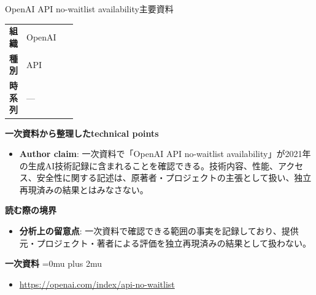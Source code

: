 \begin{technicalnote}{OpenAI API no-waitlist availability}{主要資料}
\begingroup
\begin{tabularx}{\linewidth}{@{}>{\bfseries}p{0.22\linewidth}X@{}}
組織 & OpenAI \\
種別 & API \\
時系列 & — \\
\end{tabularx}
\smallskip
{\bfseries 一次資料から整理したtechnical points}
\begin{itemize}[leftmargin=1.5em,itemsep=0.35em]
\item \textbf{Author claim}: 一次資料で「OpenAI API no-waitlist availability」が2021年の生成AI技術記録に含まれることを確認できる。技術内容、性能、アクセス、安全性に関する記述は、原著者・プロジェクトの主張として扱い、独立再現済みの結果とはみなさない。
\end{itemize}
\begin{minipage}{\linewidth}
{\bfseries 読む際の境界}
\begin{itemize}[leftmargin=1.5em,itemsep=0.35em]
\item \textbf{分析上の留意点}: 一次資料で確認できる範囲の事実を記録しており、提供元・プロジェクト・著者による評価を独立再現済みの結果として扱わない。
\end{itemize}
\begin{samepage}
{\bfseries 一次資料}
\begingroup\sloppy
\Urlmuskip=0mu plus 2mu\relax
\begin{itemize}[leftmargin=1.5em,itemsep=0.25em]
\item {\scriptsize\url{https://openai.com/index/api-no-waitlist}}
\end{itemize}
\endgroup
\end{samepage}
\end{minipage}
\endgroup
\end{technicalnote}
\medskip

